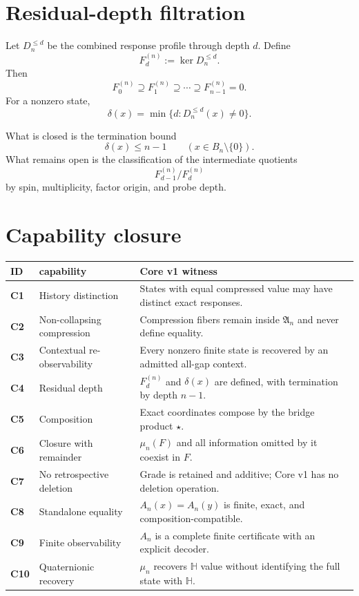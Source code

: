 \documentclass[11pt,a4paper]{article}
\newcommand{\Hq}{\mathbb H}
\newcommand{\st}{\star}
\begin{document}
\section{Residual-depth filtration}

Let $D_n^{\le d}$ be the combined response profile through depth $d$. Define
\[
F_d^{(n)}:=\ker D_n^{\le d}.
\]
Then
\[
F_0^{(n)}\supseteq F_1^{(n)}\supseteq\cdots\supseteq F_{n-1}^{(n)}=0.
\]
For a nonzero state,
\[
\delta(x)
=
\min\{d:D_n^{\le d}(x)\ne0\}.
\]

What is closed is the termination bound
\[
\boxed{
\delta(x)\le n-1
\qquad(x\in B_n\setminus\{0\}).
}
\]
What remains open is the classification of the intermediate quotients
\[
F_{d-1}^{(n)}/F_d^{(n)}
\]
by spin, multiplicity, factor origin, and probe depth.

\section{Capability closure}

\renewcommand{\arraystretch}{1.22}
\begin{longtable}{>{\bfseries}p{13mm}p{34mm}p{95mm}}
\toprule
ID & capability & Core v1 witness\\
\midrule
\endhead
C1 & History distinction & States with equal compressed value may have distinct exact responses.\\
C2 & Non-collapsing compression & Compression fibers remain inside $\mathfrak A_n$ and never define equality.\\
C3 & Contextual re-observability & Every nonzero finite state is recovered by an admitted all-gap context.\\
C4 & Residual depth & $F_d^{(n)}$ and $\delta(x)$ are defined, with termination by depth $n-1$.\\
C5 & Composition & Exact coordinates compose by the bridge product $\st$.\\
C6 & Closure with remainder & $\mu_n(F)$ and all information omitted by it coexist in $F$.\\
C7 & No retrospective deletion & Grade is retained and additive; Core v1 has no deletion operation.\\
C8 & Standalone equality & $A_n(x)=A_n(y)$ is finite, exact, and composition-compatible.\\
C9 & Finite observability & $A_n$ is a complete finite certificate with an explicit decoder.\\
C10 & Quaternionic recovery & $\mu_n$ recovers $\Hq$ value without identifying the full state with $\Hq$.\\
\bottomrule
\end{longtable}
\end{document}
